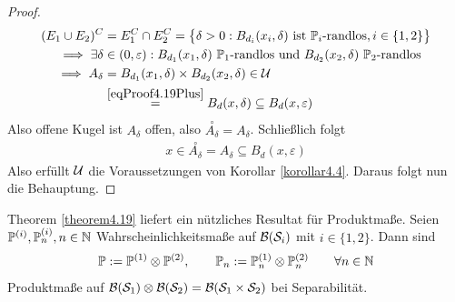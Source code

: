 \begin{proof}
\begin{align*}
(E_1\cup E_2)^C&=E_1^C\cap E_2^C=\big\lbrace\delta>0:B_{d_i}(x_i,\delta)\text{ ist $\mathbb{P}_i$-randlos},i\in\lbrace1,2\rbrace\big\rbrace\\
\implies\exists\delta&\in(0,\varepsilon):B_{d_1}(x_1,\delta)~\mathbb{P}_1\text{-randlos und }B_{d_2}(x_2,\delta)~\mathbb{P}_2\text{-randlos}\\
\implies A_\delta&=B_{d_1}(x_1,\delta)\times B_{d_2}(x_2,\delta)\in\mathcal{U}\\
&\stackrel{\eqref{eqProof4.19Plus}}{=} B_d(x,\delta)\subseteq B_d(x,\varepsilon)
\end{align*}
Also offene Kugel ist $A_\delta$ offen, also $\stackrel{\circ}{A_\delta}=A_\delta$. Schließlich folgt
\begin{align*}
x\in\stackrel{\circ}{A_\delta}=A_\delta\subseteq B_d(x,\varepsilon)
\end{align*}
Also erfüllt $\mathcal{U}$ die Voraussetzungen von Korollar \ref{korollar4.4}. Daraus folgt nun die Behauptung.
\end{proof}

Theorem \ref{theorem4.19} liefert ein nützliches Resultat für Produktmaße. Seien $\mathbb{P}^{(i)},\mathbb{P}_n^{(i)},n\in\mathbb{N}$ Wahrscheinlichkeitsmaße auf $\mathcal{B}(\mathcal{S}_i)$ mit $i\in\lbrace1,2\rbrace$. Dann sind
\begin{align*}
\mathbb{P}:=\mathbb{P}^{(1)}\otimes\mathbb{P}^{(2)},\qquad\mathbb{P}_n:=\mathbb{P}_n^{(1)}\otimes\mathbb{P}_n^{(2)}\qquad\forall n\in\mathbb{N}
\end{align*}
Produktmaße auf $\mathcal{B}(\mathcal{S}_1)\otimes\mathcal{B}(\mathcal{S}_2)=\mathcal{B}(\mathcal{S}_1\times\mathcal{S}_2)$ bei Separabilität.

